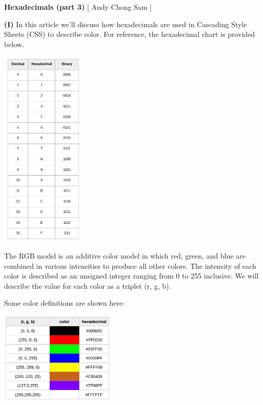 \documentclass[12pt]{article}
\begin{document}
	
	\begin{center}
		\par\noindent \large \textbf{Hexadecimals (part 3)}  [ Andy Chong Sam ]
	\end{center}
	\begin{minipage}[t]{.5\linewidth}
		\par\noindent\textbf{(I)} In this article we'll discuss how hexadecimals are used in Cascading Style Sheets (CSS) to describe color. For reference, the hexadecimal chart is provided below.  
		\begin{center}
			\includegraphics[width=4.0cm]{hex-chart.png}
		\end{center}
		\par\noindent The RGB model is an additive color model in which red, green, and blue are combined in various intensities to produce all other colors. The intensity of each color is described as an unsigned integer ranging from 0 to 255 inclusive. We will describe the value for each color as a triplet (r, g, b).
		\newline
		\par\noindent Some color definitions are shown here:
\begin{center}
	\includegraphics[width=5.5cm]{rgb.png}
\end{center}
	\end{minipage}	
\end{document}
